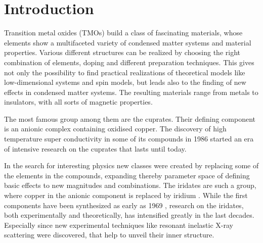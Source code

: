 \chapter{Introduction}


Transition metal oxides (TMOs) build a class of fascinating materials, whose elements 
show a multifaceted variety of  condensed matter systems and material properties.
Various different structures  can be realized  by choosing the right combination of elements, doping and different preparation techniques.
This gives not only the possibility to find practical realizations of theoretical  models like low-dimensional systems and spin models,
but leads also to the finding of new effects in condensed matter systems.
The resulting materials range from metals to insulators, with all sorts of magnetic properties. 





The most famous group among them are the cuprates. 
Their defining component is an anionic complex containing oxidised copper. 
The discovery of high temperature super conductivity in some of its compounds in 1986 \cite{cuprateHTSC} 
started an era of intensive research on the cuprates that lasts until today.

In the search for interesting physics new classes were created by replacing some of the elements in the compounds, 
expanding thereby parameter space of defining basic effects to new magnitudes  and combinations.
The iridates are such a group, where copper in the anionic component is replaced by iridium . 
While the first components have been synthesized as early as 1969 \cite{Longo1969191},
research  on the iridates, both experimentally and theoretically, has intensified greatly in the last decades.
Especially since new experimental techniques like resonant  inelastic X-ray scattering were discovered, that help to unveil their inner structure.








%



